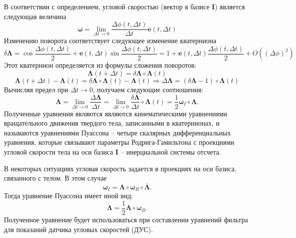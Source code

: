 \documentclass{article}
\begin{document}
В соответствии с определением, угловой скоростью (вектор в базисе
$\mathbf{I}$) является следующая величина
$$
\mathbf{\omega}=\lim_{\Delta t \rightarrow 0}\frac{\Delta\phi\left(t,\Delta t\right)}{\Delta
t}\mathbf{e}\left(t,\Delta t\right)
$$
Изменению поворота соответствует следующее изменение кватерниона
$$
\delta\mathbf{\Lambda}=\cos{\frac{\Delta\phi\left(t,\Delta t\right)}{2}} + \mathbf{e}\left(t,\Delta t\right)
\sin{\frac{\Delta\phi\left(t,\Delta t\right)}{2}} = 1 + \mathbf{e}\left(t,\Delta t\right)
{\frac{\Delta\phi\left(t,\Delta t\right)}{2}} + O\left(\left(\Delta\phi\right)^2\right)
$$
Этот кватернион определяется из формулы сложения поворотов:
$$
\mathbf{\Lambda}\left(t+\Delta t\right) = \delta \mathbf{\Lambda} \circ
\mathbf{\Lambda}\left(t\right)
$$
$$
\mathbf{\Lambda}\left(t+\Delta t\right) - \mathbf{\Lambda}\left(t\right)
=\delta \mathbf{\Lambda}\circ\mathbf{\Lambda}\left(t\right)
-\mathbf{\Lambda}\left(t\right) \Rightarrow \Delta \mathbf{\Lambda} =
\left(\delta \mathbf{\Lambda}-1\right)\circ \mathbf{\Lambda}\left(t\right)
$$
Вычисляя предел при $\Delta t \rightarrow 0$, получаем следующие соотношения:
$$
\dot{\mathbf{\Lambda}} = \lim_{\Delta t \rightarrow 0}{\frac{\Delta
\mathbf{\Lambda}}{\Delta t}} =  \lim_{\Delta t \rightarrow 0}{\frac{\delta
\mathbf{\Lambda}}{\Delta t}}\circ \mathbf{\Lambda}\left( t \right) =
\frac{1}{2}\mathbf{\omega}_I\circ\mathbf{\Lambda}.
$$
Полученные уравнения являются являются кинематическими уравнениями
вращательного движения твердого тела, записанными в кватернионах, и называются
уравнениями Пуассона -- четыре скалярных дифференциальных уравнения, которые
связывают параметры Родрига-Гамильтона с проекциями угловой скорости тела
на оси базиса $\mathbf{I}$ -- инерциальной системы отсчета.

В некоторых ситуациях угловая скорость задается в проекциях на оси базиса,
связанного с телом. В этом случае
$$
\mathbf{\omega}_I =
\mathbf{\Lambda}\circ\mathbf{\omega}_B\circ\overline{\mathbf{\Lambda}}.
$$
Тогда уравнение Пуассона имеет иной вид:
$$
\dot{\mathbf{\Lambda}} = \frac{1}{2}\mathbf{\Lambda}\circ\mathbf{\omega}_B.
$$
Полученное уравнение будет использоваться при составлении уравнений фильтра
для показаний датчика угловых скоростей (ДУС).
\end{document}
